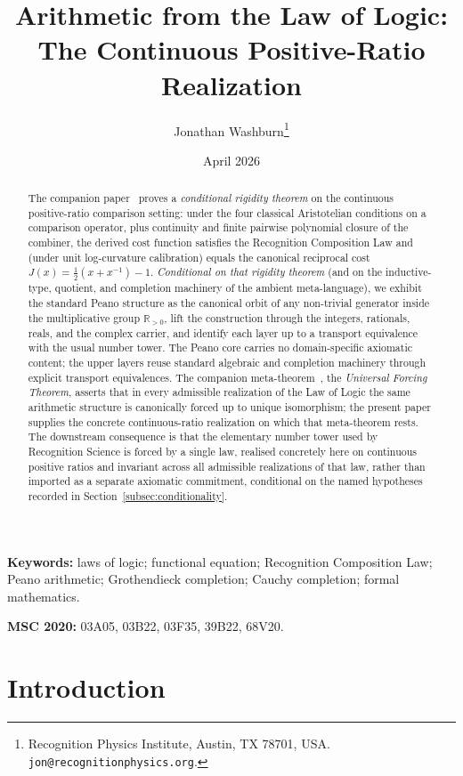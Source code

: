 \documentclass[11pt,a4paper]{article}
\title{Arithmetic from the Law of Logic:\\
The Continuous Positive-Ratio Realization}
\author{Jonathan Washburn\thanks{Recognition Physics Institute, Austin, TX 78701, USA.\\
\texttt{jon@recognitionphysics.org}.}}
\date{April 2026}
\theoremstyle{definition}
\theoremstyle{remark}
\begin{document}
\maketitle

\begin{abstract}
The companion paper~\cite{Washburn2026LogicFE} proves a
\emph{conditional rigidity theorem} on the continuous positive-ratio
comparison setting: under the four classical Aristotelian conditions
on a comparison operator, plus continuity and finite pairwise
polynomial closure of the combiner, the derived cost function
satisfies the Recognition Composition Law and (under unit
log-curvature calibration) equals the canonical reciprocal cost
$J(x) = \tfrac{1}{2}(x + x^{-1}) - 1$. \emph{Conditional on that
rigidity theorem} (and on the inductive-type, quotient, and
completion machinery of the ambient meta-language), we exhibit the
standard Peano structure as the canonical orbit of any non-trivial
generator inside the multiplicative group $\mathbb{R}_{>0}$, lift the
construction through the integers, rationals, reals, and the complex
carrier, and identify each layer up to a transport equivalence with
the usual number tower. The Peano core carries no domain-specific
axiomatic content; the upper layers reuse standard algebraic and
completion machinery through explicit transport equivalences. The
companion meta-theorem~\cite{Washburn2026UniversalForcing}, the
\emph{Universal Forcing Theorem}, asserts that in every admissible
realization of the Law of Logic the same arithmetic structure is
canonically forced up to unique isomorphism; the present paper
supplies the concrete continuous-ratio realization on which that
meta-theorem rests. The downstream consequence is that the
elementary number tower used by Recognition Science is forced by a
single law, realised concretely here on continuous positive ratios
and invariant across all admissible realizations of that law, rather
than imported as a separate axiomatic commitment, conditional on
the named hypotheses recorded in Section~\ref{subsec:conditionality}.
\end{abstract}

\noindent\textbf{Keywords:} laws of logic; functional equation;
Recognition Composition Law; Peano arithmetic; Grothendieck completion;
Cauchy completion; formal mathematics.

\medskip

\noindent\textbf{MSC 2020:} 03A05, 03B22, 03F35, 39B22, 68V20.

\section{Introduction}
\end{document}
